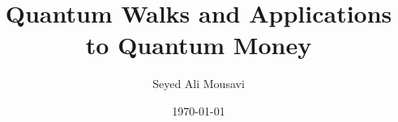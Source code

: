 \documentclass{beamer}
\title{Quantum Walks and Applications to Quantum Money}
\author{Seyed Ali Mousavi}
\institute{Supervised by Dr. Jake Doliskani}
\date{\today}
\theoremstyle{definition}
\begin{document}
\begin{frame}
    \titlepage
\end{frame}






   
    

    









    
    





    
\end{document}
